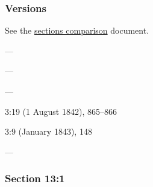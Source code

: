 	\subsubsection{Versions}
		\label{DC13-V}
		
		See the \href{https://drive.google.com/file/d/1goAvNz8jS4R8slYfMG_db55Ty2z_vmgK/view?usp=sharing}{sections comparison} document.
	
		\begin{compactdesc}
			\item[JSP] ---
			\item[BC] ---
			\item[DC 1835] ---
			\item[TS] 3:19 (1 August 1842), 865--866
			\item[MS] 3:9 (January 1843), 148
			\item[DC 1844] ---
		\end{compactdesc}

	\subsubsection{Section 13:1} %
		\label{DC13-1}

